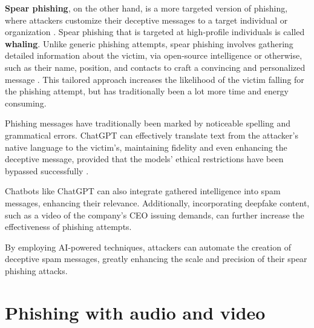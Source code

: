 \textbf{Spear phishing}, on the other hand, is a more targeted version of phishing, where attackers customize their deceptive messages to a target individual or organization \citep{basitComprehensiveSurveyAIenabledPhishingAttacks2021, fakhouriAIDrivenSolutionsForSocialEngineeringAttacks2024}. Spear phishing that is targeted at high-profile individuals is called \textbf{whaling}. Unlike generic phishing attempts, spear phishing involves gathering detailed information about the victim, via open-source intelligence or otherwise, such as their name, position, and contacts to craft a convincing and personalized message \citep{salahdineSocialEngineeringAttacks2019}. This tailored approach increases the likelihood of the victim falling for the phishing attempt, but has traditionally been a lot more time and energy consuming.

Phishing messages have traditionally been marked by noticeable spelling and grammatical errors. ChatGPT can effectively translate text from the attacker’s native language to the victim’s, maintaining fidelity and even enhancing the deceptive message, provided that the models' ethical restrictions have been bypassed successfully \citep{guptaFromChatGPTtoThreatGPT2023}.

Chatbots like ChatGPT can also integrate gathered intelligence into spam messages, enhancing their relevance. Additionally, incorporating deepfake content, such as a video of the company’s CEO issuing demands, can further increase the effectiveness of phishing attempts.

By employing AI-powered techniques, attackers can automate the creation of deceptive spam messages, greatly enhancing the scale and precision of their spear phishing attacks.




















\section{Phishing with audio and video}
\begin{comment}
Phishing & spear phishing

What to cover:
    - What is phishing (via email and ALSO other means)
    - Spear phishing a more targeted form of phishing
    - How ChatGPT can be used to improve scam messages
    - ChatGPT:n eettisten ohjeistusten ohittaminen on jo käsitelty kohdassa Chatbots

\end{comment}

